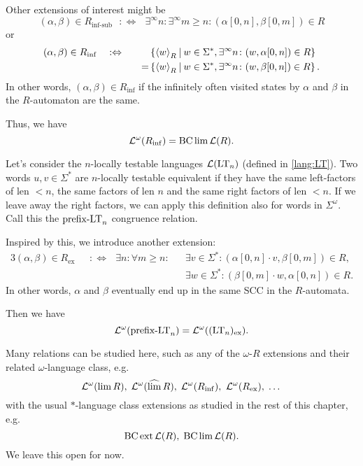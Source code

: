 Other extensions of interest might be
\[ (\alpha,\beta) \in R_{\operatorname{inf-sub}} \ \ \ :\Leftrightarrow \ \ \ \exists^\infty n \colon \exists^\infty m \ge n \colon (\alpha[0,n],\beta[0,m]) \in R \]
or
\begin{alignat*}{3}
(\alpha,\beta) \in R_{\operatorname{inf}} \ \ \ & :\Leftrightarrow \ \ \ && \Set{\left<w\right>_R}{w \in \Sigma^*, \exists^\infty n \colon (w,\alpha[0,n]) \in R} \\
&& = & \Set{\left<w\right>_R}{w \in \Sigma^*, \exists^\infty n \colon (w,\beta[0,n]) \in R} .
\end{alignat*}
In other words, $(\alpha,\beta) \in R_{\operatorname{inf}}$ if the infinitely often visited states by $\alpha$ and $\beta$ in the $R$-automaton are the same.

Thus, we have
\[ \mathcal{L}^\omega(R_{\operatorname{inf}}) = \operatorname{BC} \lim \mathcal{L}(R) . \]

Let's consider the $n$-locally testable languages $\mathcal{L}(\textup{\textrm{LT}}_n)$ (defined in \cref{lang:LT}). Two words $u,v \in \Sigma^*$ are $n$-locally testable equivalent if they have the same left-factors of len $< n$, the same factors of len $n$ and the same right factors of len $< n$. If we leave away the right factors, we can apply this definition also for words in $\Sigma^\omega$. Call this the $\textup{\textrm{prefix-LT}}_n$ congruence relation.

Inspired by this, we introduce another extension:
\begin{alignat*}{3}
(\alpha,\beta) \in R_{\operatorname{ex}} \ \ \ & :\Leftrightarrow \ \ \ \exists n \colon \forall m \ge n \colon && \exists v \in \Sigma^* \colon (\alpha[0,n] \cdot v,\beta[0,m]) \in R , \\
&&  & \exists w \in \Sigma^* \colon (\beta[0,m] \cdot w,\alpha[0,n]) \in R .
\end{alignat*}
In other words, $\alpha$ and $\beta$ eventually end up in the same SCC in the $R$-automata.

Then we have
\[ \mathcal{L}^\omega(\textup{\textrm{prefix-LT}}_n) = \mathcal{L}^\omega((\textup{\textrm{LT}}_n)_{\operatorname{ex}}) . \]

Many relations can be studied here, such as any of the $\omega$-$R$ extensions and their related $\omega$-language class, e.g.
\[ \Lang^\omega(\lim R), \; \Lang^\omega(\dlim R), \; \Lang^\omega(R_{\operatorname{inf}}), \ \Lang^\omega(R_{\operatorname{ex}}), \; \dots \]
with the usual $*$-language class extensions as studied in the rest of this chapter, e.g.
\[ \operatorname{BC} \operatorname{ext} \mathcal{L}(R), \; \operatorname{BC} \lim \mathcal{L}(R) . \]
We leave this open for now.

